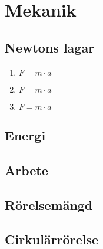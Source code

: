 \section{Mekanik}

\subsection{Newtons lagar}
\begin{enumerate}
	\item\begin{math}
  			F = m \cdot a
		\end{math} \\[2pt]
	\item\begin{math}
  			F = m \cdot a
		\end{math} \\[2pt]
	\item\begin{math}
  			F = m \cdot a
		\end{math} \\[2pt]
\end{enumerate}

\subsection{Energi}

\subsection{Arbete}

\subsection{Rörelsemängd}

\subsection{Cirkulärrörelse}
